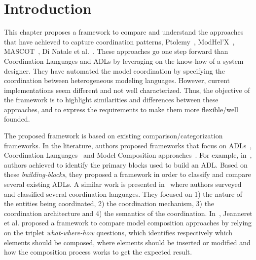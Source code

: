 \section{Introduction}
This chapter proposes a framework to compare and understand the approaches that have achieved to capture coordination patterns, \ie Ptolemy~\cite{ptoleframebib}, ModHel'X~\cite{modhelxbib}, MASCOT~\cite{mascotbib}, Di Natale et al.~\cite{dinatale}. These approaches go one step forward than Coordination Languages and ADLs by leveraging on the know-how of a system designer. They have automated the model coordination by specifying the coordination between heterogeneous modeling languages. However, current implementations seem different and not well characterized. Thus, the objective of the framework is to highlight similarities and differences between these approaches, and to express the requirements to make them more flexible/well founded.

The proposed framework is based on existing comparison/categorization frameworks. In the literature, authors proposed frameworks that focus on ADLs~\cite{frameadlsbib}, Coordination Languages~\cite{coordmodels} and Model Composition approaches~\cite{framecompoas}. For example, in~\cite{frameadlsbib}, authors achieved to identify the primary blocks used to build an ADL. Based on these \emph{building-blocks}, they proposed a framework in order to classify and compare several existing ADLs. A similar work is presented in~\cite{coordmodels} where authors surveyed and classified several coordination languages. They focused on 1) the nature of the entities being coordinated, 2) the coordination mechanism, 3) the coordination architecture and 4) the semantics of the coordination. In~\cite{framecompoas}, Jeanneret et al. proposed a framework to compare model composition approaches by relying on the triplet \emph{what-where-how} questions, which identifies respectively which elements should be composed, where elements should be inserted or modified and how the composition process works to get the expected result. 

